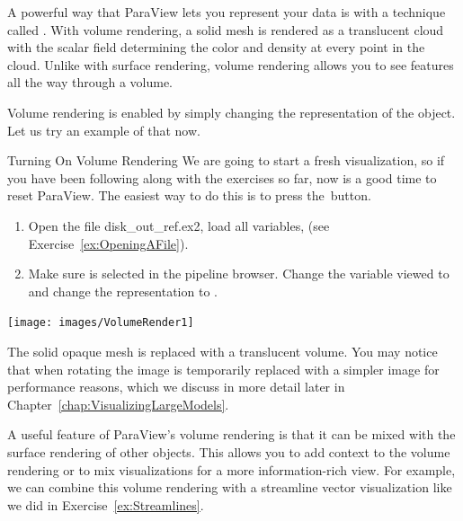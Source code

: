 A powerful way that ParaView lets you represent your data is with a
technique called .  With volume rendering, a
solid mesh is rendered as a translucent cloud with the scalar field
determining the color and density at every point in the cloud.  Unlike with
surface rendering, volume rendering allows you to see features all the way
through a volume.

Volume rendering is enabled by simply changing the representation of the
object.  Let us try an example of that now.

\begin{exercise}{Turning On Volume Rendering}
  \label{ex:VolumeRendering}%
  We are going to start a fresh visualization, so if you have been
  following along with the exercises so far, now is a good time to reset
  ParaView.  The easiest way to do this is to press the~\disconnect button.

  \begin{enumerate}
  \item Open the file disk\_out\_ref.ex2, load all variables, \apply (see
    Exercise~\ref{ex:OpeningAFile}).
  \item Make sure  is selected in the pipeline
    browser.  Change the variable viewed to  and change the
    representation to .
  \end{enumerate}

  \begin{inlinefig}
    \texttt{[image: images/VolumeRender1]}
  \end{inlinefig}

  The solid opaque mesh is replaced with a translucent volume. You may
  notice that when rotating the image is temporarily replaced with a
  simpler image for performance reasons, which we discuss
  in more detail later in Chapter~\ref{chap:VisualizingLargeModels}.
\end{exercise}

A useful feature of ParaView's volume rendering is that it can be mixed
with the surface rendering of other objects.  This allows you to add
context to the volume rendering or to mix visualizations for a more
information-rich view.  For example, we can combine this volume rendering
with a streamline vector visualization like we did in
Exercise~\ref{ex:Streamlines}.

